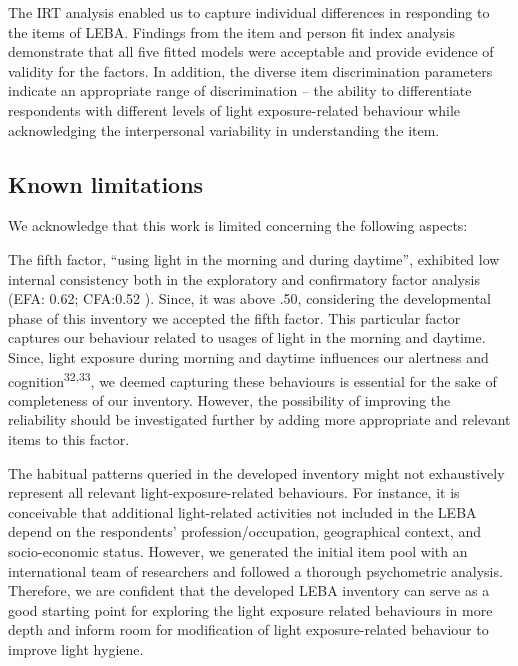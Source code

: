 \documentclass[
  man]{apa6}
\begin{document}
The IRT analysis enabled us to capture individual differences in responding to the items of LEBA. Findings from the item and person fit index analysis demonstrate that all five fitted models were acceptable and provide evidence of validity for the factors. In addition, the diverse item discrimination parameters indicate an appropriate range of discrimination -- the ability to differentiate respondents with different levels of light exposure-related behaviour while acknowledging the interpersonal variability in understanding the item.

\hypertarget{known-limitations}{%
\subsection{Known limitations}\label{known-limitations}}

We acknowledge that this work is limited concerning the following aspects:

The fifth factor, ``using light in the morning and during daytime'', exhibited low internal consistency both in the exploratory and confirmatory factor analysis (EFA: 0.62; CFA:0.52 ). Since, it was above .50, considering the developmental phase of this inventory we accepted the fifth factor. This particular factor captures our behaviour related to usages of light in the morning and daytime. Since, light exposure during morning and daytime influences our alertness and cognition\textsuperscript{32,33}, we deemed capturing these behaviours is essential for the sake of completeness of our inventory. However, the possibility of improving the reliability should be investigated further by adding more appropriate and relevant items to this factor.

The habitual patterns queried in the developed inventory might not exhaustively represent all relevant light-exposure-related behaviours. For instance, it is conceivable that additional light-related activities not included in the LEBA depend on the respondents' profession/occupation, geographical context, and socio-economic status. However, we generated the initial item pool with an international team of researchers and followed a thorough psychometric analysis. Therefore, we are confident that the developed LEBA inventory can serve as a good starting point for exploring the light exposure related behaviours in more depth and inform room for modification of light exposure-related behaviour to improve light hygiene.
\end{document}
